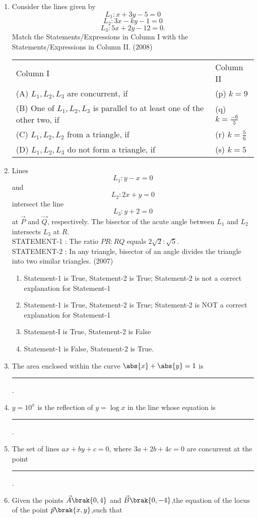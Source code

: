 \begin{enumerate}[label=\thesubsection.\arabic*.,ref=\thesubsection.\theenumi]
	\item Consider the lines given by
		$$L_1:x+3y-5=0$$ $$L_2:3x-ky-1=0$$ $$L_3:5x+2y-12=0.$$
		Match the Statements/Expressions in {Column I} with the Statements/Expressions in {Column II}. 
		\hfill(2008)
		\begin{tabular}{p{8cm} p{3cm}}
			Column I & Column II \\
			(A) $L_1,L_2,L_3$ are concurrent, if & (p) $k=9$ \\
			(B) One of $L_1,L_2,L_3$ is parallel to at least one of the other two, if & (q) $k=\frac{-6}{5}$ \\
			(C) $L_1,L_2,L_2$ from a triangle, if & (r) $k=\frac{5}{6}$ \\
			(D) $L_1,L_2,L_3$ do not form a triangle, if & (s) $k=5$
		\end{tabular}
\item Lines $$L_{1}: y-x=0$$ and $$L_{2}: 2x+y=0$$ intersect the line $$L_{3}: y+2=0$$ at $\vec{P}$ and $\vec{Q}$, respectively. The bisector of the acute 
angle between $L_{1}$ and $L_{2}$ intersects $L_{3}$ at $R$.\\
{STATEMENT-1 :} The ratio $PR:RQ$ equals $2\sqrt{2}:\sqrt{5}$.\\
{STATEMENT-2 :} In any triangle, bisector of an angle divides the triangle into two similar triangles.
\hfill{(2007)}
   \begin{enumerate}
   \item Statement-1 is True, Statement-2 is True; Statement-2 
is not a correct explanation for Statement-1 
   \item Statement-1 is True, Statement-2 is True; Statement-2 
is NOT a correct explanation for Statement-1 
   \item Statement-I is True, Statement-2 is False
   \item Statement-1 is False, Statement-2 is True. 
   \end{enumerate}
	\item The area enclosed within the curve $\abs{x}+\abs{y} =1$ is \rule{1cm}{0.01pt}.
    \hfill {}
    \item $y = 10^x $ is the reflection of $y=\log x$ in the line whose equation is \rule{1cm}{0.01pt}.
    \hfill{}
    \item The set of lines $ax+by+c=0$, where $3a+2b+4c=0$ are concurrent at the point \rule{1cm}{0.01pt}.
    \hfill{}
    \item Given the points $\vec{A}\brak{0,4}$ and $\vec{B}\brak{0,-4}$,the equation of the locus of the point $\vec{p}\brak{x,y}$,such that 

\end{enumerate}
